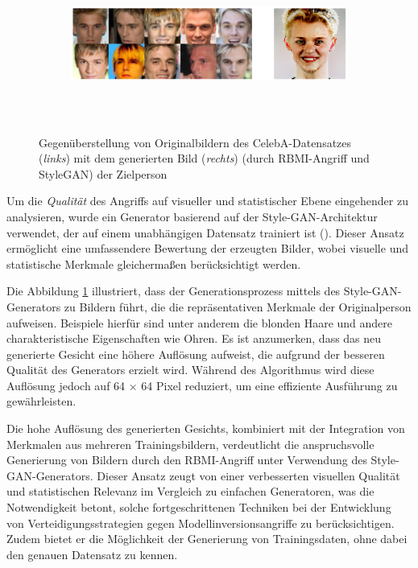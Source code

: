 \begin{figure}[H]
	\centering
	\begin{subfigure}[b]{0.8\linewidth}
		\includegraphics[width=\linewidth, height=5cm, keepaspectratio]{Bilder/0_celeba_rbmi_stylegan.png}
	\end{subfigure}
	\caption{Gegenüberstellung von Originalbildern des CelebA-Datensatzes (\textit{links}) mit dem generierten Bild (\textit{rechts}) (durch \glqq RBMI\grqq-Angriff und StyleGAN) der Zielperson}
	\label{img:rbmi_visual_stylegan}
\end{figure}

Um die \textit{Qualität} des Angriffs auf visueller und statistischer Ebene eingehender zu analysieren, wurde ein Generator basierend auf der Style-GAN-Architektur verwendet, der auf einem unabhängigen Datensatz trainiert ist (\cite{noauthor_nvlabsffhq-dataset_2023}). Dieser Ansatz ermöglicht eine umfassendere Bewertung der erzeugten Bilder, wobei visuelle und statistische Merkmale gleichermaßen berücksichtigt werden.

Die Abbildung \ref{img:rbmi_visual_stylegan} illustriert, dass der Generationsprozess mittels des Style-GAN-Generators zu Bildern führt, die die repräsentativen Merkmale der Originalperson aufweisen. Beispiele hierfür sind unter anderem die blonden Haare und andere charakteristische Eigenschaften wie Ohren. Es ist anzumerken, dass das neu generierte Gesicht eine höhere Auflösung aufweist, die aufgrund der besseren Qualität des Generators erzielt wird. Während des Algorithmus wird diese Auflösung jedoch auf 64 $\times$ 64 Pixel reduziert, um eine effiziente Ausführung zu gewährleisten.

Die hohe Auflösung des generierten Gesichts, kombiniert mit der Integration von Merkmalen aus mehreren Trainingsbildern, verdeutlicht die anspruchsvolle Generierung von Bildern durch den \glqq RBMI\grqq-Angriff unter Verwendung des Style-GAN-Generators. Dieser Ansatz zeugt von einer verbesserten visuellen Qualität und statistischen Relevanz im Vergleich zu einfachen Generatoren, was die Notwendigkeit betont, solche fortgeschrittenen Techniken bei der Entwicklung von Verteidigungsstrategien gegen Modellinversionsangriffe zu berücksichtigen. Zudem bietet er die Möglichkeit der Generierung von Trainingsdaten, ohne dabei den genauen Datensatz zu kennen.

